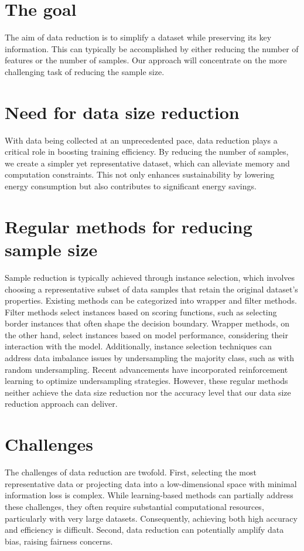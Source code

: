 \section{The goal}

The aim of data reduction is to simplify a dataset while preserving its key information. This can typically be accomplished by either reducing the number of features or the number of samples. Our approach will concentrate on the more challenging task of reducing the sample size.

\section{Need for data size reduction}

With data being collected at an unprecedented pace, data reduction plays a critical role in boosting training efficiency. By reducing the number of samples, we create a simpler yet representative dataset, which can alleviate memory and computation constraints. This not only enhances sustainability by lowering energy consumption but also contributes to significant energy savings.

\section{Regular methods for reducing sample size}

Sample reduction is typically achieved through instance selection, which involves choosing a representative subset of data samples that retain the original dataset's properties. Existing methods can be categorized into wrapper and filter methods. Filter methods select instances based on scoring functions, such as selecting border instances that often shape the decision boundary. Wrapper methods, on the other hand, select instances based on model performance, considering their interaction with the model. Additionally, instance selection techniques can address data imbalance issues by undersampling the majority class, such as with random undersampling. Recent advancements have incorporated reinforcement learning to optimize undersampling strategies. However, these regular methods neither achieve the data size reduction nor the accuracy level that our data size reduction approach can deliver.

\section{Challenges}

The challenges of data reduction are twofold. First, selecting the most representative data or projecting data into a low-dimensional space with minimal information loss is complex. While learning-based methods can partially address these challenges, they often require substantial computational resources, particularly with very large datasets. Consequently, achieving both high accuracy and efficiency is difficult. Second, data reduction can potentially amplify data bias, raising fairness concerns.